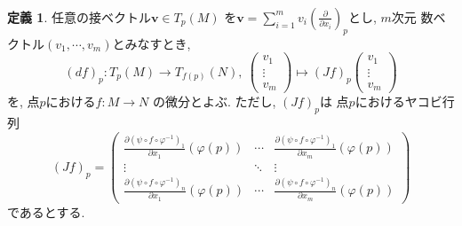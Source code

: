 \documentclass[dvipdfmx,cjk]{beamer}
\theoremstyle{definition}
\newtheorem{dfn}{\textbf{ 定義 }}
\newtheorem{prop}[dfn]{\textbf{ 命題 }}
\begin{document}

\begin{frame}
  \frametitle{}
  \begin{dfn}\label{def:differential}
    任意の接ベクトル$\boldsymbol{v}\in T_p(M)$
    を$\boldsymbol{v}=
    \sum_{i=1}^{m}v_i\left(\frac{\partial}
    {\partial x_i}\right)_p$とし, $m$次元
    数ベクトル$(v_1,\cdots ,v_m)$とみなすとき, 
     $$(df)_p:T_p(M)\to T_{f(p)}(N),\ 
    \begin{pmatrix}
      v_1\\
      \vdots \\
      v_m
    \end{pmatrix}
    \mapsto
    (Jf)_p
    \begin{pmatrix}
      v_1\\
      \vdots \\
      v_m
    \end{pmatrix}$$
    を, 点$p$における$f:M\to N$
    の微分とよぶ. ただし, $(Jf)_p$は
    点$p$におけるヤコビ行列
    $$(Jf)_p=
    \left(
    \begin{array}{ccc}
      \frac{\partial (\psi\circ f\circ \varphi^{-1})_1}{\partial x_1}(\varphi(p))&\cdots &\frac{\partial (\psi\circ f\circ \varphi^{-1})_1}{\partial x_m}(\varphi(p))\\
      \vdots &\ddots& \vdots \\
      \frac{\partial (\psi\circ f\circ \varphi^{-1})_n}{\partial x_1}(\varphi(p))&\cdots &\frac{\partial (\psi\circ f\circ \varphi^{-1})_n}{\partial x_m}(\varphi(p)) 
    \end{array} 
    \right)$$
    であるとする. 
  \end{dfn}
\end{frame}
\end{document}
